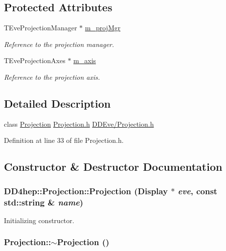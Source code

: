 \subsection*{Protected Attributes}
\begin{DoxyCompactItemize}
\item 
TEveProjectionManager $\ast$ \hyperlink{class_d_d4hep_1_1_projection_af3e297ffc1962b82749d48fe43ed6830}{m\_\-projMgr}
\begin{DoxyCompactList}\small\item\em Reference to the projection manager. \item\end{DoxyCompactList}\item 
TEveProjectionAxes $\ast$ \hyperlink{class_d_d4hep_1_1_projection_a694863e25d4dab1fda8bf4221f099402}{m\_\-axis}
\begin{DoxyCompactList}\small\item\em Reference to the projection axis. \item\end{DoxyCompactList}\end{DoxyCompactItemize}


\subsection{Detailed Description}
class \hyperlink{class_d_d4hep_1_1_projection}{Projection} \hyperlink{_projection_8h}{Projection.h} \hyperlink{_projection_8h}{DDEve/Projection.h} 

Definition at line 33 of file Projection.h.

\subsection{Constructor \& Destructor Documentation}
\hypertarget{class_d_d4hep_1_1_projection_a7e6355eabd19c474eefd0572fc2b8026}{
\subsubsection[{Projection}]{\setlength{\rightskip}{0pt plus 5cm}DD4hep::Projection::Projection ({\bf Display} $\ast$ {\em eve}, \/  const std::string \& {\em name})}}
\label{class_d_d4hep_1_1_projection_a7e6355eabd19c474eefd0572fc2b8026}


Initializing constructor. \hypertarget{class_d_d4hep_1_1_projection_ac0554f994078308f0169a4629a2d1b0a}{
\subsubsection[{$\sim$Projection}]{\setlength{\rightskip}{0pt plus 5cm}Projection::$\sim$Projection ()}}
\label{class_d_d4hep_1_1_projection_ac0554f994078308f0169a4629a2d1b0a}


